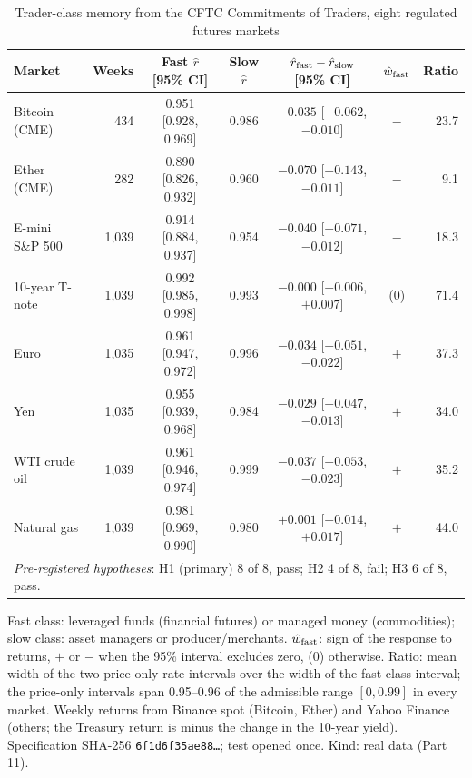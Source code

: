 \begin{table}[t]\centering\small
\begin{threeparttable}
\caption{Trader-class memory from the CFTC Commitments of Traders, eight regulated futures markets}\label{p1:tab:cot}
\setlength{\tabcolsep}{3pt}\footnotesize
\begin{tabular}{lrccccr}
\toprule
Market & Weeks & Fast $\hat r$ [95\% CI] & Slow $\hat r$ & $\hat r_{\rm fast}-\hat r_{\rm slow}$ [95\% CI] & $\hat w_{\rm fast}$ & Ratio\\
\midrule
Bitcoin (CME) & 434 & 0.951 [0.928, 0.969] & 0.986 & $-0.035$ [$-0.062$, $-0.010$] & $-$ & 23.7\\
Ether (CME) & 282 & 0.890 [0.826, 0.932] & 0.960 & $-0.070$ [$-0.143$, $-0.011$] & $-$ & 9.1\\
E-mini S\&P 500 & 1{,}039 & 0.914 [0.884, 0.937] & 0.954 & $-0.040$ [$-0.071$, $-0.012$] & $-$ & 18.3\\
10-year T-note & 1{,}039 & 0.992 [0.985, 0.998] & 0.993 & $-0.000$ [$-0.006$, $+0.007$] & (0) & 71.4\\
Euro & 1{,}035 & 0.961 [0.947, 0.972] & 0.996 & $-0.034$ [$-0.051$, $-0.022$] & $+$ & 37.3\\
Yen & 1{,}035 & 0.955 [0.939, 0.968] & 0.984 & $-0.029$ [$-0.047$, $-0.013$] & $+$ & 34.0\\
WTI crude oil & 1{,}039 & 0.961 [0.946, 0.974] & 0.999 & $-0.037$ [$-0.053$, $-0.023$] & $+$ & 35.2\\
Natural gas & 1{,}039 & 0.981 [0.969, 0.990] & 0.980 & $+0.001$ [$-0.014$, $+0.017$] & $+$ & 44.0\\
\midrule
\multicolumn{7}{l}{\emph{Pre-registered hypotheses}: H1 (primary) 8 of 8, pass; H2 4 of 8, fail; H3 6 of 8, pass.}\\
\bottomrule
\end{tabular}
\begin{tablenotes}\footnotesize\item Fast class: leveraged funds (financial futures) or managed money (commodities); slow class: asset managers or producer/merchants. $\hat w_{\rm fast}$: sign of the response to returns, $+$ or $-$ when the 95\% interval excludes zero, (0) otherwise. Ratio: mean width of the two price-only rate intervals over the width of the fast-class interval; the price-only intervals span 0.95--0.96 of the admissible range $[0,0.99]$ in every market. Weekly returns from Binance spot (Bitcoin, Ether) and Yahoo Finance (others; the Treasury return is minus the change in the 10-year yield). Specification SHA-256 \texttt{6f1d6f35ae88\ldots}; test opened once. Kind: real data (Part 11).\end{tablenotes}
\end{threeparttable}
\end{table}

